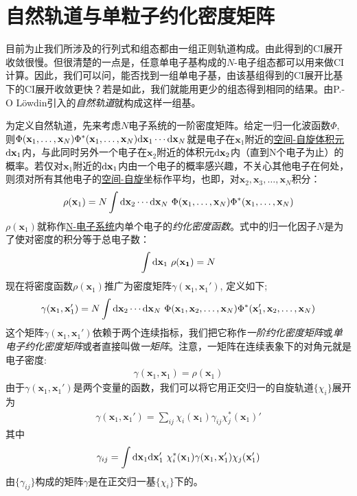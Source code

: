 \section{自然轨道与单粒子约化密度矩阵}
目前为止我们所涉及的行列式和组态都由一组正则\hft 轨道构成。由此得到的CI展开收敛很慢。但很清楚的一点是，任意单电子基构成的$N$-电子组态都可以用来做CI计算。因此，我们可以问，能否找到一组单电子基，由该基组得到的CI展开比\hft 基下的CI展开收敛更快？若是如此，我们就能用更少的组态得到相同的结果。由P.-O L\"owdin引入的\emph{自然轨道}就构成这样一组基。

为定义自然轨道，先来考虑$N$电子系统的一阶密度矩阵。给定一归一化波函数$\Phi$, 则$\Phi(\mathbf{x}_1,\ldots,\mathbf{x}_N)\Phi^*(\mathbf{x}_1,\ldots,\mathbf{x}_N)\ddx_1\cdots\ddx_N$就是电子在$\mathbf{x}_1$附近的\underline{\underline{空间-自旋}体积元}$\ddx_1$内，与此同时另外一个电子在$\mathbf{x}_2$附近的体积元$\ddx_2$内（直到N个电子为止）的概率。若仅对$\mathbf{x}_1$附近的$\ddx_1$内由一个电子的概率感兴趣，不关心其他电子在何处，则须对所有其他电子的\underline{空间-自旋}坐标作平均，也即，对$\mathbf{x}_2,\mathbf{x}_3,\ldots,\mathbf{x}_N$积分：
\begin{align}
\rho(\mathbf{x}_1) = N \int\ddx_2\cdots\ddx_N \,\, \Phi(\mathbf{x}_1,\ldots,\mathbf{x}_N)\Phi^*(\mathbf{x}_1,\ldots,\mathbf{x}_N)
\end{align}
$\rho(\mathbf{x}_1)$就称作\underline{N-电子系统}内单个电子的\emph{约化密度函数}。式中的归一化因子$N$是为了使对密度的积分等于总电子数：
\begin{align}
\int\ddx_1\,\,\rho(\mathbf{x_1}) = N
\end{align}
现在将密度函数$\rho(\mathbf{x}_1)$推广为密度矩阵$\gamma(\mathbf{x}_1,\mathbf{x}_1')$, 定义如下;
\begin{align}
\label{4.35}
\gamma(\mathbf{x}_1,\mathbf{x}_1') = N \int\ddx_2\cdots\ddx_N \,\, \Phi(\mathbf{x}_1,\mathbf{x}_2,\ldots,\mathbf{x}_N)\Phi^*(\mathbf{x}_1',\mathbf{x}_2,\ldots,\mathbf{x}_N)
\end{align}
这个矩阵$\gamma(\mathbf{x}_1,\mathbf{x}_1')$依赖于两个连续指标，我们把它称作\emph{一阶约化密度矩阵}或\emph{单电子约化密度矩阵}或者直接叫做\emph{一矩阵}。注意，一矩阵在连续表象下的对角元就是电子密度:
\begin{align}
\gamma(\mathbf{x}_1,\mathbf{x}_1) = \rho(\mathbf{x}_1)
\end{align}
由于$\gamma(\mathbf{x}_1,\mathbf{x}_1')$是两个变量的函数，我们可以将它用正交归一的\hft 自旋轨道$\{\chi_i\}$展开为
\begin{align}
\gamma(\mathbf{x}_1,\mathbf{x}_1') = \sum_{ij} \chi_i(\mathbf{x}_1) \gamma_{ij} \chi_j^*(\mathbf{x}_1)'
\label{4.37}
\end{align}
其中
\begin{align}
\gamma_{ij} = \int\ddx_1\ddx_1'\,\,\chi_i^*(\mathbf{x}_1)\gamma(\mathbf{x}_1,\mathbf{x}_1')\chi_j(\mathbf{x}_1')
\end{align}
由$\{\gamma_{ij}\}$构成的矩阵$\gamma$是在正交归一基$\{\chi_i\}$下的。

